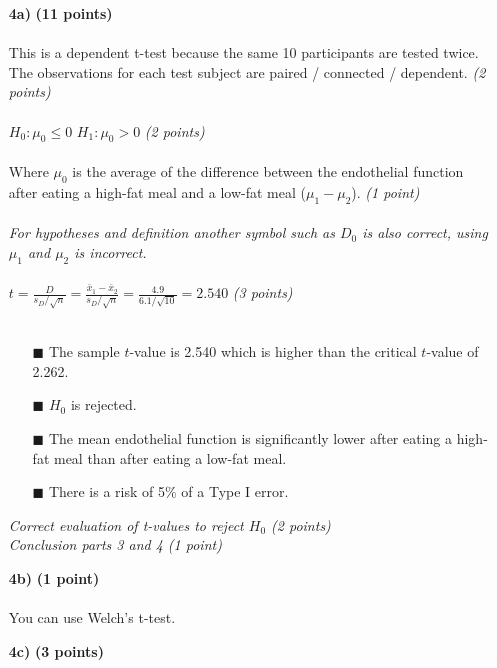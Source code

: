 \begin{itemize}
\item[\textbf{4a)}] \textbf{(11 points)} \\ \\
This is a dependent t-test because the same 10 participants are tested twice. The observations for each test subject are paired / connected / dependent. \textit{(2 points)}\\ \\
$H_0: \mu_0 \leq 0$ \hspace{3cm} $H_1: \mu_0 > 0$ \hspace{3cm} \textit{(2 points)} \\ \\
Where $\mu_0$ is the average of the difference between the endothelial function after eating a high-fat meal and a low-fat meal ($\mu_1 - \mu_2$). \textit{(1 point)} \\ \\ 
\textit{For hypotheses and definition another symbol such as $D_0$ is also correct, using $\mu_1$ and $\mu_2$ is incorrect.} \\ \\
$t = \frac{D}{s_D / \sqrt{n}} = \frac{\bar{x}_1 - \bar{x}_2}{s_D / \sqrt{n}} = \frac{4.9}{6.1 / \sqrt{10}} = 2.540$ \textit{(3 points)}\\ \\
        \begin{itemize}
        \item[$\blacksquare$] The sample $t$-value is 2.540 which is higher than the critical $t$-value of 2.262.
        \item[$\blacksquare$] $H_0$ is rejected.
        \item[$\blacksquare$] The mean endothelial function is significantly lower after eating a high-fat meal than after eating a low-fat meal.
\item[$\blacksquare$] There is a risk of 5\% of a Type I error.
        \end{itemize}
        \textit{Correct evaluation of t-values to reject $H_0$ (2 points) \\ Conclusion parts 3 and 4 (1 point)} \\
\item[\textbf{4b)}] \textbf{(1 point)} \\ \\
You can use Welch’s t-test. \\
\item[\textbf{4c)}] \textbf{(3 points)} \\

\end{itemize}
